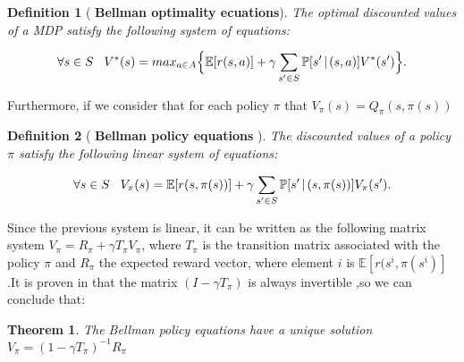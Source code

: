 \documentclass[12pt]{article}
\newtheorem{theorem}{Theorem}[section]
\newtheorem{definition}{Definition}[section]
\numberwithin{equation}{section}
\begin{document}
\begin{definition}[{ \bf Bellman optimality ecuations}]
    The optimal discounted values  of a MDP satisfy the following system of equations:

    \begin{equation}
        \forall s \in S  \hspace{3mm} V^*(s)=max_{a \in A} \Bigl\{ \mathbb{E}[r(s,a)]+ \gamma \sum_{s' \in S} \mathbb{P}[s' \hspace{.5mm}|\hspace{.5mm} (s,a) ]V^*(s')\Bigl\}.
    \end{equation}
      
    
\end{definition}



Furthermore, if we consider that for each policy $\pi$  that $V_{\pi}(s)=Q_{\pi}(s,\pi(s))$





\begin{definition}[{ \bf Bellman policy equations }]
    The  discounted values  of a  policy $\pi$ satisfy the following linear system of equations:

    \begin{equation}
        \forall s \in S  \hspace{3mm} V_{\pi}(s)=\mathbb{E}[r(s,\pi(s))]+ \gamma \sum_{s' \in S} \mathbb{P}[s' \hspace{.5mm}|\hspace{.5mm} (s,\pi(s)) ]V_{\pi}(s').
    \end{equation}
      
    
\end{definition}


Since the previous system is linear, it can be written as the following matrix system $V_\pi = R_\pi + \gamma T_\pi V_\pi$, where $T_\pi$ is the transition matrix associated with the policy $\pi$ and $R_\pi$ the expected reward vector, where element $i$ is $\mathbb{E}[r(s^i,\pi(s^i)]$.It is proven in \cite{mohri2018foundations} that the matrix $(I-\gamma T_\pi)$ is always invertible ,so we  can conclude that:

\begin{theorem}
   The Bellman policy equations have a unique solution $V_\pi= ( 1 - \gamma T_\pi)^{-1}R_\pi$
\end{theorem}
\end{document}

